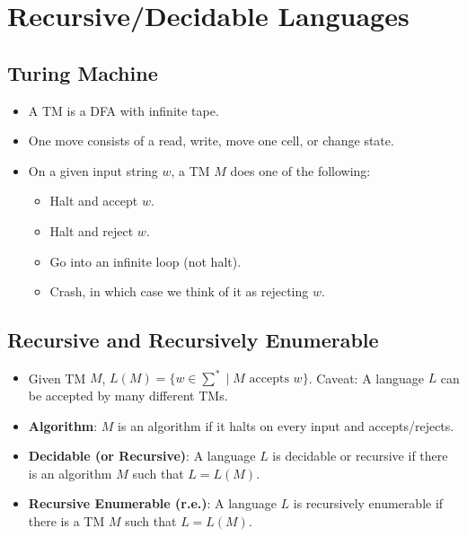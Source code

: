 \documentclass[12pt]{article}
\date{April 20, 2021}
\begin{document}
\maketitle

\section{Recursive/Decidable Languages}

\subsection{Turing Machine}
\begin{itemize}
    \item A TM is a DFA with infinite tape.
    \item One move consists of a read, write, move one cell, or change state.
    \item On a given input string $w$, a TM $M$ does one of the following:
    \begin{itemize}
        \item Halt and accept $w$.
        \item Halt and reject $w$.
        \item Go into an infinite loop (not halt).
        \item Crash, in which case we think of it as rejecting $w$.
    \end{itemize}
\end{itemize}

\subsection{Recursive and Recursively Enumerable}
\begin{itemize}
    \item Given TM $M$, $L(M) = \{ w \in \sum^\ast \mid \text{$M$ accepts $w$} \}$. Caveat: A language $L$ can be accepted by many different TMs.
    \item \textbf{Algorithm}: $M$ is an algorithm if it halts on every input and accepts/rejects.
    \item \textbf{Decidable (or Recursive)}: A language $L$ is decidable or recursive if there is an algorithm $M$ such that $L = L(M)$.
    \item \textbf{Recursive Enumerable (r.e.)}: A language $L$ is recursively enumerable if there is a TM $M$ such that $L = L(M)$.
\end{itemize}
\end{document}
